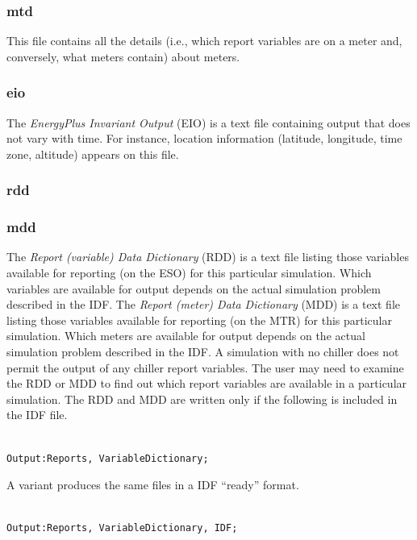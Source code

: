 \subsubsection{mtd}\label{mtd}

This file contains all the details (i.e., which report variables are on a meter and, conversely, what meters contain) about meters.

\subsubsection{eio}\label{eio}

The \emph{EnergyPlus Invariant Output} (EIO) is a text file containing output that does not vary with time. For instance, location information (latitude, longitude, time zone, altitude) appears on this file.

\subsubsection{rdd}\label{rdd}

\subsubsection{mdd}\label{mdd}

The \emph{Report (variable) Data Dictionary} (RDD) is a text file listing those variables available for reporting (on the ESO) for this particular simulation. Which variables are available for output depends on the actual simulation problem described in the IDF. The \emph{Report (meter) Data Dictionary} (MDD) is a text file listing those variables available for reporting (on the MTR) for this particular simulation. Which meters are available for output depends on the actual simulation problem described in the IDF. A simulation with no chiller does not permit the output of any chiller report variables. The user may need to examine the RDD or MDD to find out which report variables are available in a particular simulation. The RDD and MDD are written only if the following is included in the IDF file.

\begin{lstlisting}

Output:Reports, VariableDictionary;
\end{lstlisting}

A variant produces the same files in a IDF ``ready'' format.

\begin{lstlisting}

Output:Reports, VariableDictionary, IDF;
\end{lstlisting}

